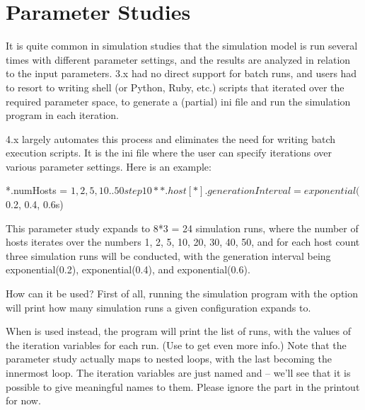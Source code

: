 \section{Parameter Studies}
\label{sec:config-sim:parameter-studies}

It is quite common in simulation studies that the simulation model is
run several times with different parameter settings, and the results
are analyzed in relation to the input parameters. {\opp} 3.x had no
direct support for batch runs, and users had to resort to writing shell
(or Python, Ruby, etc.) scripts that iterated over the required
parameter space, to generate a (partial) ini file and run the
simulation program in each iteration.

{\opp} 4.x largely automates this process and eliminates the need for
writing batch execution scripts. It is the ini file where the user can
specify iterations over various parameter settings.
Here is an example:

\begin{inifile}
*.numHosts = ${1, 2, 5, 10..50 step 10}
**.host[*].generationInterval = exponential(${0.2, 0.4, 0.6}s)
\end{inifile}

This parameter study expands to 8*3 = 24 simulation runs, where the number of
hosts iterates over the numbers 1, 2, 5, 10, 20, 30, 40, 50, and for
each host count three simulation runs will be conducted, with the generation
interval being exponential(0.2), exponential(0.4), and
exponential(0.6).

How can it be used? First of all, running the simulation program with the
 option will print how many simulation runs a given
configuration expands to.


When  is used instead, the program will print the list
of runs, with the values of the iteration variables for each run.
(Use  to get even more info.)
Note that the parameter study actually maps to nested loops, with the last
 becoming the innermost loop. The iteration variables are
just named  and  -- we'll see that it is possible to give
meaningful names to them. Please ignore the  part in
the printout for now.


